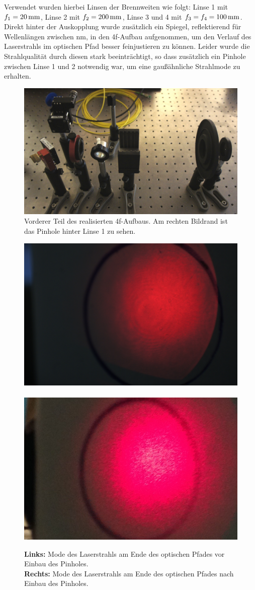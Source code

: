 Verwendet wurden hierbei Linsen der Brennweiten wie folgt: Linse 1 mit $f_{1}=\unit[20]{mm}$, Linse 2 mit $f_{2}=\unit[200]{mm}$, Linse 3 und 4 mit $f_{3}=f_{4}=\unit[100]{mm}$. Direkt hinter der Auskopplung wurde zusätzlich ein Spiegel, reflektierend für Wellenlängen zwischen \unit[400-700]{nm}, in den 4f-Aufbau aufgenommen, um den Verlauf des Laserstrahls im optischen Pfad besser feinjustieren zu können. Leider wurde die Strahlqualität durch diesen stark beeinträchtigt, so dass zusätzlich ein Pinhole zwischen Linse 1 und 2 notwendig war, um eine gaußähnliche Strahlmode zu erhalten.\\ 

\begin{figure}[h]
\centering
\includegraphics[width=0.7\linewidth]{images/_DSC7961.JPG}
\caption{Vorderer Teil des realisierten 4f-Aufbaus. Am rechten Bildrand ist das Pinhole hinter Linse 1 zu sehen.}
\label{fig:_DSC7961}
\end{figure}

\begin{figure}
	\centering
	\includegraphics[width=0.45\linewidth]{images/_DSC7988.JPG}~
	\includegraphics[width=0.45\linewidth]{images/IMG_2223.jpg}
	\caption{
		\textbf{Links:} Mode des Laserstrahls am Ende des optischen Pfades vor Einbau des Pinholes.\\
		\textbf{Rechts:} Mode des Laserstrahls am Ende des optischen Pfades nach Einbau des Pinholes.
	}
	\label{fig:_DSC7988}
\end{figure}


